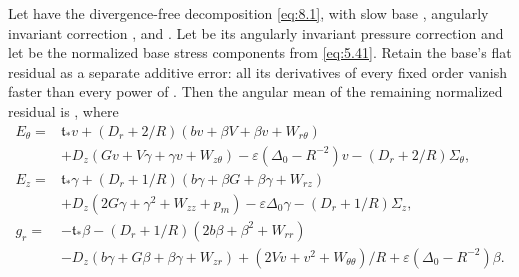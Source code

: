 \begin{proposition}\label{prop:8.1}
Let  have the divergence-free decomposition \eqref{eq:8.1}, with slow base
,
angularly invariant correction , and
. Let  be its angularly invariant pressure
correction and let  be the normalized base stress components from \eqref{eq:5.41}. Retain the
base's flat residual as a separate additive error: all its derivatives of every fixed order vanish faster than
every power of . Then the angular mean of the remaining normalized residual is
, where
\begin{equation}
\begin{aligned}
E_\theta={}&\mathfrak t_*v+(D_r+2/R)(bv+\beta V+\beta v+W_{r\theta})\\
 &+D_z(Gv+V\gamma+\gamma v+W_{z\theta})
   -\varepsilon(\Delta_0-R^{-2})v-(D_r+2/R)\Sigma_\theta,\\
E_z={}&\mathfrak t_*\gamma+(D_r+1/R)(b\gamma+\beta G+\beta\gamma+W_{rz})\\
 &+D_z(2G\gamma+\gamma^2+W_{zz}+p_m)-\varepsilon\Delta_0\gamma-(D_r+1/R)\Sigma_z,\\
g_r={}&-\mathfrak t_*\beta-(D_r+1/R)(2b\beta+\beta^2+W_{rr})\\
 &-D_z(b\gamma+G\beta+\beta\gamma+W_{zr})
   +(2Vv+v^2+W_{\theta\theta})/R+\varepsilon(\Delta_0-R^{-2})\beta.
\end{aligned}
\tag{8.3}\label{eq:8.3}
\end{equation}
\end{proposition}

